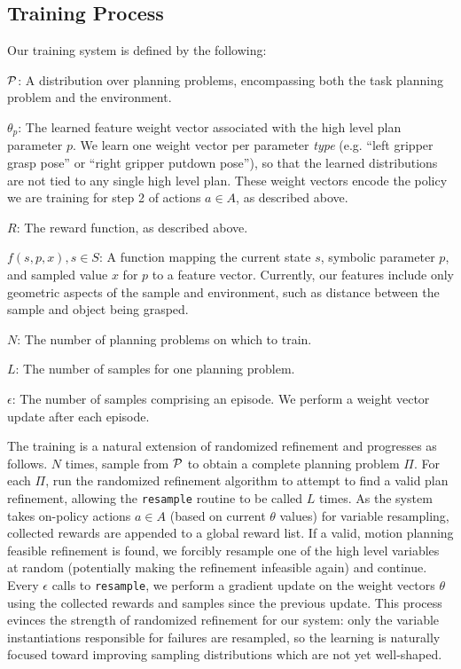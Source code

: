 \subsection{Training Process}
Our training system is defined by the following:
\begin{tightlist}
\item[$\mathcal{P}$:] A distribution over planning problems, encompassing both
the task planning problem and the environment.
\item[$\theta_{p}$:] The learned feature weight vector associated with the high
level plan parameter $p$. We learn one
weight vector per parameter \emph{type} (e.g. ``left gripper grasp pose'' or ``right
gripper putdown pose''), so that the learned distributions are
not tied to any single high level plan. These weight vectors encode the policy
we are training for step 2 of actions $a \in A$, as described above.
\item[$R$:] The reward function, as described above.
\item[$f(s, p, x), s \in S$:] A function mapping the current state $s$, symbolic
parameter $p$, and sampled value $x$ for $p$ to a feature vector. Currently, our features include
only geometric aspects of the sample and environment, such as distance between the sample and object being grasped.
\item[$N$:] The number of planning problems on which to train.
\item[$L$:] The number of samples for one planning problem.
\item[$\epsilon$:] The number of samples comprising an episode. We perform
a weight vector update after each episode.
\end{tightlist}

The training is a natural extension of randomized
refinement and progresses as follows. $N$ times, sample from $\mathcal{P}$ to obtain
a complete planning problem $\Pi$. For each $\Pi$, run the randomized refinement
algorithm to attempt to find a valid plan refinement, allowing the \texttt{resample}
routine to be called $L$ times. As the system takes on-policy actions $a \in A$ (based on
current $\theta$ values) for variable resampling, collected
rewards are appended to a global reward list. If a valid, motion planning
feasible refinement is found, we forcibly resample one of
the high level variables at random (potentially making the refinement infeasible again)
and continue. Every $\epsilon$ calls to
\texttt{resample}, we perform a gradient update on the weight vectors $\theta$ using the
collected rewards and samples since the previous update. This process
evinces the strength of randomized refinement for our system: only the variable
instantiations responsible for failures are resampled, so the learning is naturally
focused toward improving sampling distributions which are not yet well-shaped.

